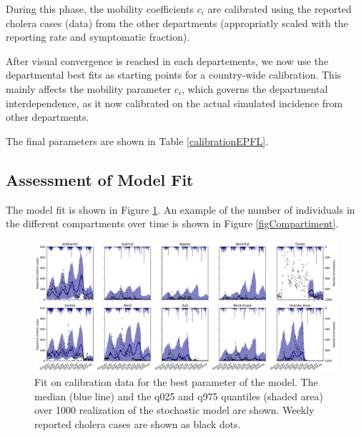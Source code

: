 During this phase, the mobility coefficients $c_i$ are calibrated using the reported cholera cases (data) from the other departments (appropriatly scaled with the reporting rate and symptomatic fraction).

After visual convergence is reached in each departements, we now use the departmental best fits as starting points for a country-wide calibration. This mainly affects the mobility parameter $c_i$, which governs the departmental interdependence, as it now calibrated on the actual simulated incidence from other departments.

The final parameters are shown in Table \ref{calibrationEPFL}.

\subsection{Assessment of Model Fit}
The model fit is shown in Figure \ref{fitEPFL}. An example of the number of individuals in the different compartments over time is shown in Figure \ref{figCompartiment}.

\begin{figure}[htbp]
\begin{center}
\includegraphics[width=1.0\textwidth]{fig_cholera-haiti-ocv/fit.png}
\caption{Fit on calibration data for the best parameter of the model. The median (blue line) and the q025 and q975 quantiles (shaded area) over 1000 realization of the stochastic model are shown. Weekly reported cholera cases are shown as black dots.}
\label{fitEPFL}
\end{center}
\end{figure}


